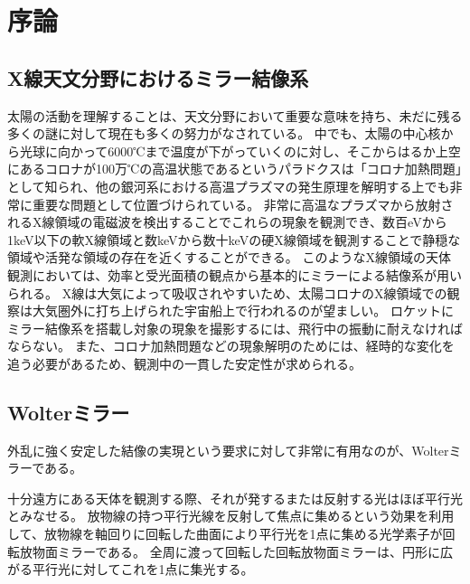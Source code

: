 \chapter{序論}
\thispagestyle{empty}
\label{chap1}
\graphicspath{{chap1/figure/}}
\minitoc


\newpage
\section{X線天文分野におけるミラー結像系}
\label{chap1_imaging_mirror_in_astronomy}

太陽の活動を理解することは、天文分野において重要な意味を持ち、未だに残る多くの謎に対して現在も多くの努力がなされている。
中でも、太陽の中心核から光球に向かって6000℃まで温度が下がっていくのに対し、そこからはるか上空にあるコロナが100万℃の高温状態であるというパラドクスは「コロナ加熱問題」として知られ、他の銀河系における高温プラズマの発生原理を解明する上でも非常に重要な問題として位置づけられている。\cite{ShimizuToshifumi2018}
非常に高温なプラズマから放射されるX線領域の電磁波を検出することでこれらの現象を観測でき、数百eVから1keV以下の軟X線領域と数keVから数十keVの硬X線領域を観測することで静穏な領域や活発な領域の存在を近くすることができる。
このようなX線領域の天体観測においては、効率と受光面積の観点から基本的にミラーによる結像系が用いられる。
X線は大気によって吸収されやすいため、太陽コロナのX線領域での観察は大気圏外に打ち上げられた宇宙船上で行われるのが望ましい。
ロケットにミラー結像系を搭載し対象の現象を撮影するには、飛行中の振動に耐えなければならない。
また、コロナ加熱問題などの現象解明のためには、経時的な変化を追う必要があるため、観測中の一貫した安定性が求められる。

\clearpage
\newpage

\section{Wolterミラー}
\label{chap1_wolter_mirror}

外乱に強く安定した結像の実現という要求に対して非常に有用なのが、Wolterミラーである。\cite{1952AnP...445...94W}

十分遠方にある天体を観測する際、それが発するまたは反射する光はほぼ平行光とみなせる。
放物線の持つ平行光線を反射して焦点に集めるという効果を利用して、放物線を軸回りに回転した曲面により平行光を1点に集める光学素子が回転放物面ミラーである。
全周に渡って回転した回転放物面ミラーは、円形に広がる平行光に対してこれを1点に集光する。

